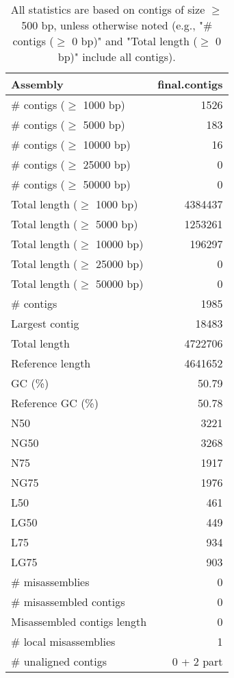 \documentclass[12pt,a4paper]{article}
\begin{document}
\begin{table}[ht]
\begin{center}
\caption{All statistics are based on contigs of size $\geq$ 500 bp, unless otherwise noted (e.g., "\# contigs ($\geq$ 0 bp)" and "Total length ($\geq$ 0 bp)" include all contigs).}
\begin{tabular}{|l*{1}{|r}|}
\hline
Assembly & final.contigs \\ \hline
\# contigs ($\geq$ 1000 bp) & 1526 \\ \hline
\# contigs ($\geq$ 5000 bp) & 183 \\ \hline
\# contigs ($\geq$ 10000 bp) & 16 \\ \hline
\# contigs ($\geq$ 25000 bp) & 0 \\ \hline
\# contigs ($\geq$ 50000 bp) & 0 \\ \hline
Total length ($\geq$ 1000 bp) & 4384437 \\ \hline
Total length ($\geq$ 5000 bp) & 1253261 \\ \hline
Total length ($\geq$ 10000 bp) & 196297 \\ \hline
Total length ($\geq$ 25000 bp) & 0 \\ \hline
Total length ($\geq$ 50000 bp) & 0 \\ \hline
\# contigs & 1985 \\ \hline
Largest contig & 18483 \\ \hline
Total length & 4722706 \\ \hline
Reference length & 4641652 \\ \hline
GC (\%) & 50.79 \\ \hline
Reference GC (\%) & 50.78 \\ \hline
N50 & 3221 \\ \hline
NG50 & 3268 \\ \hline
N75 & 1917 \\ \hline
NG75 & 1976 \\ \hline
L50 & 461 \\ \hline
LG50 & 449 \\ \hline
L75 & 934 \\ \hline
LG75 & 903 \\ \hline
\# misassemblies & 0 \\ \hline
\# misassembled contigs & 0 \\ \hline
Misassembled contigs length & 0 \\ \hline
\# local misassemblies & 1 \\ \hline
\# unaligned contigs & 0 + 2 part \\ \hline

\end{tabular}
\end{center}
\end{table}
\end{document}

